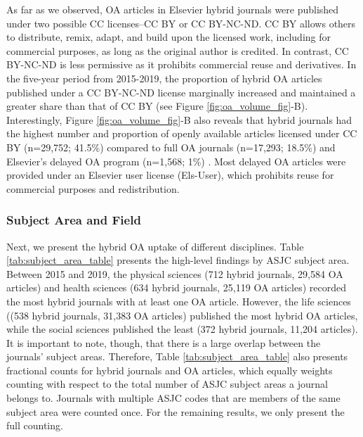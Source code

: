 \documentclass[a4paper,man,floatsintext,longtable,noextraspace,12pt]{apa6}
\begin{document}
As far as we observed, OA articles in Elsevier hybrid journals were
published under two possible CC licenses--CC BY or CC BY-NC-ND. CC BY
allows others to distribute, remix, adapt, and build upon the licensed
work, including for commercial purposes, as long as the original author
is credited. In contrast, CC BY-NC-ND is less permissive as it prohibits
commercial reuse and derivatives. In the five-year period from
2015-2019, the proportion of hybrid OA articles published under a CC
BY-NC-ND license marginally increased and maintained a greater share
than that of CC BY (see Figure \ref{fig:oa_volume_fig}-B).
Interestingly, Figure \ref{fig:oa_volume_fig}-B also reveals that hybrid
journals had the highest number and proportion of openly available
articles licensed under CC BY (n=29,752; 41.5\%) compared to full OA
journals (n=17,293; 18.5\%) and Elsevier's delayed OA program (n=1,568;
1\%) . Most delayed OA articles were provided under an Elsevier user
license (Els-User), which prohibits reuse for commercial purposes and
redistribution.

\hypertarget{subject-area-and-field}{%
\subsubsection*{Subject Area and Field}\label{subject-area-and-field}}

Next, we present the hybrid OA uptake of different disciplines. Table
\ref{tab:subject_area_table} presents the high-level findings by ASJC
subject area. Between 2015 and 2019, the physical sciences (712 hybrid
journals, 29,584 OA articles) and health sciences (634 hybrid journals,
25,119 OA articles) recorded the most hybrid journals with at least one
OA article. However, the life sciences ((538 hybrid journals, 31,383 OA
articles) published the most hybrid OA articles, while the social
sciences published the least (372 hybrid journals, 11,204 articles). It
is important to note, though, that there is a large overlap between the
journals' subject areas. Therefore, Table \ref{tab:subject_area_table}
also presents fractional counts for hybrid journals and OA articles,
which equally weights counting with respect to the total number of ASJC
subject areas a journal belongs to. Journals with multiple ASJC codes
that are members of the same subject area were counted once. For the
remaining results, we only present the full counting.
\end{document}
